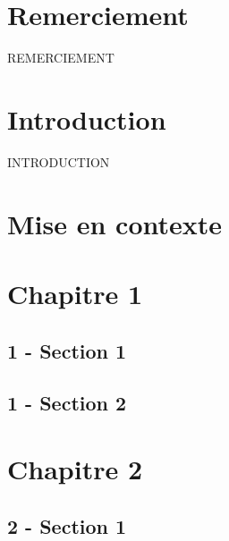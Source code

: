 \documentclass[11pt,a4paper]{report}
\begin{document}


\renewcommand{\contentsname}{Sommaire}
\tableofcontents


\newpage
\chapter*{Remerciement}

REMERCIEMENT


\chapter*{Introduction}

INTRODUCTION


% 

\listoffigures

\listoftables


\newpage

\chapter{Mise en contexte}

\chapter{Chapitre 1}

\section{1 - Section 1}

\section{1 - Section 2}

\chapter{Chapitre 2}

\section{2 - Section 1}
\end{document}
